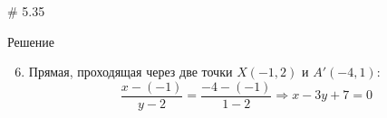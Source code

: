 \documentclass[russian]{beamer}
\begin{document}
  \begin{frame}{\# 5.35}
    \begin{block}{Решение}
      
      \begin{enumerate}
       \setcounter{enumi}{5}
        
        \item Прямая, проходящая через две точки $X(-1, 2)$ и $A'(-4, 1)$:
        \[
          \frac{x - (-1)}{y - 2} = \frac{-4 - (-1)}{1 - 2}
          \Rightarrow
          \boxed{x - 3y + 7 = 0}
        \]
      \end{enumerate}
    \end{block}
  \end{frame}
\end{document}
